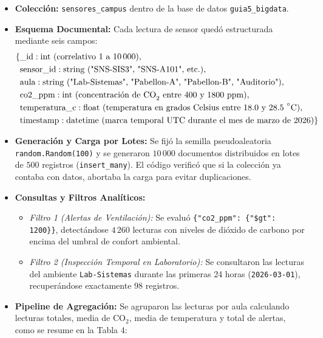 \documentclass[12pt,a4paper]{article}
\begin{document}
\begin{itemize}
    \item \textbf{Colección:} \texttt{sensores\_campus} dentro de la base de datos \texttt{guia5\_bigdata}.
    \item \textbf{Esquema Documental:} Cada lectura de sensor quedó estructurada mediante seis campos:
    \begin{align*}
        \{ &\text{\_id}: \text{int (correlativo 1 a 10\,000)}, \\
           &\text{sensor\_id}: \text{string ("SNS-SIS3", "SNS-A101", etc.)}, \\
           &\text{aula}: \text{string ("Lab-Sistemas", "Pabellon-A", "Pabellon-B", "Auditorio")}, \\
           &\text{co2\_ppm}: \text{int (concentración de CO}_2\text{ entre 400 y 1800 ppm)}, \\
           &\text{temperatura\_c}: \text{float (temperatura en grados Celsius entre 18.0 y 28.5 }^\circ\text{C)}, \\
           &\text{timestamp}: \text{datetime (marca temporal UTC durante el mes de marzo de 2026)} \}
    \end{align*}
    \item \textbf{Generación y Carga por Lotes:} Se fijó la semilla pseudoaleatoria \texttt{random.Random(100)} y se generaron $10\,000$ documentos distribuidos en lotes de $500$ registros (\texttt{insert\_many}). El código verificó que si la colección ya contaba con datos, abortaba la carga para evitar duplicaciones.
    \item \textbf{Consultas y Filtros Analíticos:}
    \begin{itemize}
        \item \textit{Filtro 1 (Alertas de Ventilación):} Se evaluó \texttt{\{"co2\_ppm": \{"\$gt": 1200\}\}}, detectándose $4\,260$ lecturas con niveles de dióxido de carbono por encima del umbral de confort ambiental.
        \item \textit{Filtro 2 (Inspección Temporal en Laboratorio):} Se consultaron las lecturas del ambiente \texttt{Lab-Sistemas} durante las primeras 24 horas (\texttt{2026-03-01}), recuperándose exactamente $98$ registros.
    \end{itemize}
    \item \textbf{Pipeline de Agregación:} Se agruparon las lecturas por aula calculando lecturas totales, media de $\text{CO}_2$, media de temperatura y total de alertas, como se resume en la Tabla 4:
\end{itemize}
\end{document}
